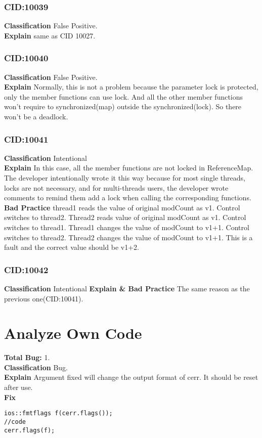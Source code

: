 \documentclass[10pt]{article}
\begin{document}
\subsubsection{CID:10039}
\textbf{Classification}
False Positive.
\\\textbf{Explain} 
same as CID 10027.

\subsubsection{CID:10040}
\textbf{Classification}
False Positive.
\\\textbf{Explain} 
Normally, this is not a problem because the parameter lock is protected, only the member functions can use lock. And all the other member functions won't require to synchronized(map) outside the synchronized(lock). So there won't be a deadlock.

\subsubsection{CID:10041}
\textbf{Classification}
Intentional
\\\textbf{Explain} 
In this case, all the member functions are not locked in ReferenceMap. The developer intentionally wrote it this way because for most single threads, locks are not necessary, and for multi-threads users, the developer wrote comments to remind them add a lock when calling the corresponding functions.
\\\textbf{Bad Practice}
thread1 reads the value of original modCount as v1. Control switches to thread2. Thread2 reads value of original modCount as v1. Control switches to thread1. Thread1 changes the value of modCount to v1+1. Control switches to thread2. Thread2 changes the value of modCount to v1+1. This is a fault and the correct value should be v1+2.

\subsubsection{CID:10042}
\textbf{Classification}
Intentional
\textbf{Explain \& Bad Practice} 
The same reason as the previous one(CID:10041).


\section*{Analyze Own Code}
\textbf{Total Bug:}
1.\\
\textbf{Classification}
Bug.\\
\textbf{Explain}
Argument fixed will change the output format of cerr. It should be reset after use.\\
\textbf{Fix}
\begin{verbatim}
ios::fmtflags f(cerr.flags());
//code
cerr.flags(f);
\end{verbatim}
\end{document}
